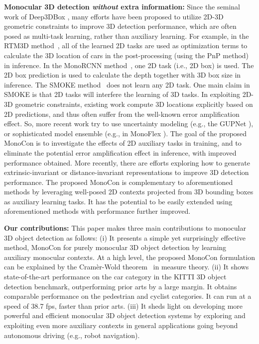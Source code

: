 \documentclass[letterpaper]{article} \usepackage{aaai22}  \usepackage{times}  \usepackage{helvet}  \usepackage{courier}  \usepackage[hyphens]{url}  \usepackage{graphicx} \urlstyle{rm} \def\UrlFont{\rm}  \usepackage{natbib}  \usepackage{caption} \DeclareCaptionStyle{ruled}{labelfont=normalfont,labelsep=colon,strut=off} \frenchspacing  \setlength{\pdfpagewidth}{8.5in}  \setlength{\pdfpageheight}{11in}  \usepackage{algorithm}
\begin{document}
\textbf{Monocular 3D detection \textit{without} extra information:} Since the seminal work of Deep3DBox \cite{deep3dbox}, many efforts \cite{fqnet, rtm3d, monods, monopair, object3d, monorcnn, ground-aware, monogeo, gupnet, monoflex} have been proposed to utilize 2D-3D geometric constraints to improve 3D detection performance, which are often posed as multi-task learning, rather than auxiliary learning. 
For example, in the RTM3D method~\cite{rtm3d}, all of the learned 2D tasks are used as optimization terms to calculate the 3D location of cars in the post-processing (using the PnP method) in inference.
In the MonoRCNN method~\cite{monorcnn}, one 2D task (i.e., 2D box) is used. The 2D box prediction is used to calculate the depth together with 3D box size in inference. The SMOKE method~\cite{smoke} does not learn any 2D task. One main claim in SMOKE is that 2D tasks will interfere the learning of 3D tasks.
In exploiting 2D-3D geometric constraints, existing work compute 3D locations explicitly based on 2D predictions, and thus often suffer from the well-known error amplification effect. So, more recent work try to use uncertainty modeling (e.g., the GUPNet \cite{gupnet}), or sophisticated model ensemble  (e.g., in MonoFlex \cite{monoflex}). The goal of the proposed MonoCon is to investigate the effects of 2D auxiliary tasks in training, and to eliminate the potential error amplification effect in inference, with improved performance obtained. 
More recently, there are efforts exploring how to generate extrinsic-invariant \cite{monoef} or distance-invariant \cite{movi3d} representations to improve 3D detection performance. The proposed MonoCon is complementary to aforementioned methods by leveraging well-posed 2D contexts projected from 3D bounding boxes as auxiliary learning tasks. It has the potential to be easily extended using aforementioned methods with performance further improved.




\textbf{Our contributions: } This paper makes three main contributions to monocular 3D object detection as follows: 
(i) It presents a simple yet surprisingly effective method, MonoCon for purely monocular 3D object detection by learning auxiliary monocular contexts. At a high level, the proposed MonoCon formulation can be explained by the Cram\`er-Wold theorem~\cite{cramer1936some} in measure theory. 
(ii) It shows state-of-the-art performance on the car category in the KITTI 3D object detection benchmark, outperforming prior arts by a large margin. It  obtains comparable performance on the pedestrian and cyclist categories. It can run at a speed of 38.7 fps, faster than prior arts. 
(iii) It sheds light on developing more powerful and efficient monocular 3D object detection systems by exploring and exploiting even more auxiliary contexts in general applications going beyond autonomous driving (e.g., robot navigation).   
\end{document}
